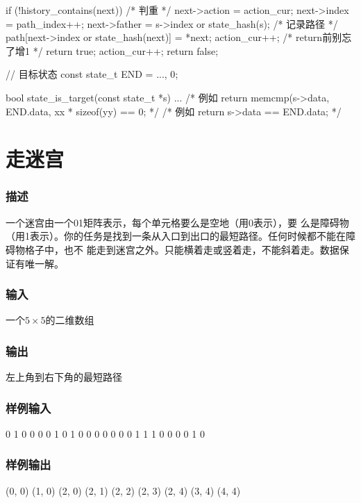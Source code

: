 \begin{Codex}[label=bfs_template.c]
{{{            if (!history_contains(next)) { /* 判重 */
                next->action = action_cur;
                next->index = path_index++;
                next->father = s->index or state_hash(s);
                /* 记录路径 */
                path[next->index or state_hash(next)] = *next;
                action_cur++;  /* return前别忘了增1 */
                return true;
            }
        }
        action_cur++;
    }
    return false;
}

// 目标状态
const state_t END = {..., 0};

bool state_is_target(const state_t *s) {
    ...
    /* 例如 return memcmp(s->data, END.data, xx * sizeof(yy) == 0; */
    /* 例如 return s->data == END.data; */
}
\end{Codex}

\section{走迷宫} %

\subsubsection{描述}
一个迷宫由一个01矩阵表示，每个单元格要么是空地（用0表示），要
么是障碍物（用1表示）。你的任务是找到一条从入口到出口的最短路径。任何时候都不能在障碍物格子中，也不
能走到迷宫之外。只能横着走或竖着走，不能斜着走。数据保证有唯一解。

\subsubsection{输入}
一个$5 \times 5$的二维数组

\subsubsection{输出}
左上角到右下角的最短路径

\subsubsection{样例输入}
\begin{Code}
0 1 0 0 0
0 1 0 1 0
0 0 0 0 0
0 1 1 1 0
0 0 0 1 0
\end{Code}

\subsubsection{样例输出}
(0, 0)
(1, 0)
(2, 0)
(2, 1)
(2, 2)
(2, 3)
(2, 4)
(3, 4)
(4, 4)

